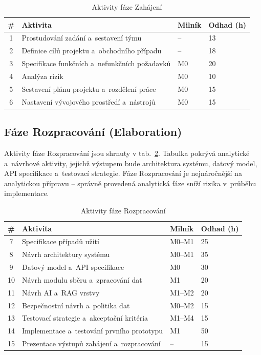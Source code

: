 \documentclass[a4paper, 11pt]{article}
\begin{document}
\begin{table}[H]
\centering\small
\begin{tabularx}{\textwidth}{c X l l}
\toprule
\textbf{\#} & \textbf{Aktivita} & \textbf{Milník} & \textbf{Odhad (h)} \\
\midrule
1 & Prostudování zadání a~sestavení týmu & -- & 13 \\
2 & Definice cílů projektu a~obchodního případu & -- & 18 \\
3 & Specifikace funkčních a~nefunkčních požadavků & M0 & 20 \\
4 & Analýza rizik & M0 & 10 \\
5 & Sestavení plánu projektu a~rozdělení práce & M0 & 15 \\
6 & Nastavení vývojového prostředí a~nástrojů & M0 & 15 \\
\bottomrule
\end{tabularx}
\caption{Aktivity fáze Zahájení}
\label{tab:plan-zahajeni}
\end{table}

\subsection{Fáze Rozpracování (Elaboration)}

Aktivity fáze Rozpracování jsou shrnuty v tab.~\ref{tab:plan-rozpracovani}.
Tabulka pokrývá analytické a~návrhové aktivity, jejichž výstupem bude architektura systému, datový model, API specifikace a~testovací strategie. Fáze Rozpracování je nejnáročnější na analytickou přípravu -- správně provedená analytická fáze sníží rizika v~průběhu implementace.

\begin{table}[H]
\centering\small
\begin{tabularx}{\textwidth}{c X l l}
\toprule
\textbf{\#} & \textbf{Aktivita} & \textbf{Milník} & \textbf{Odhad (h)} \\
\midrule
7 & Specifikace případů užití & M0--M1 & 25 \\
8 & Návrh architektury systému & M0--M1 & 35 \\
9 & Datový model a~API specifikace & M0 & 30 \\
10 & Návrh modulu sběru a~zpracování dat & M1 & 20 \\
11 & Návrh AI a~RAG vrstvy & M1--M2 & 20 \\
12 & Bezpečnostní návrh a~politika dat & M0--M2 & 15 \\
13 & Testovací strategie a~akceptační kritéria & M1--M4 & 15 \\
14 & Implementace a~testování prvního prototypu & M1 & 50 \\
15 & Prezentace výstupů zahájení a~rozpracování & -- & 15 \\
\bottomrule
\end{tabularx}
\caption{Aktivity fáze Rozpracování}
\label{tab:plan-rozpracovani}
\end{table}
\end{document}
